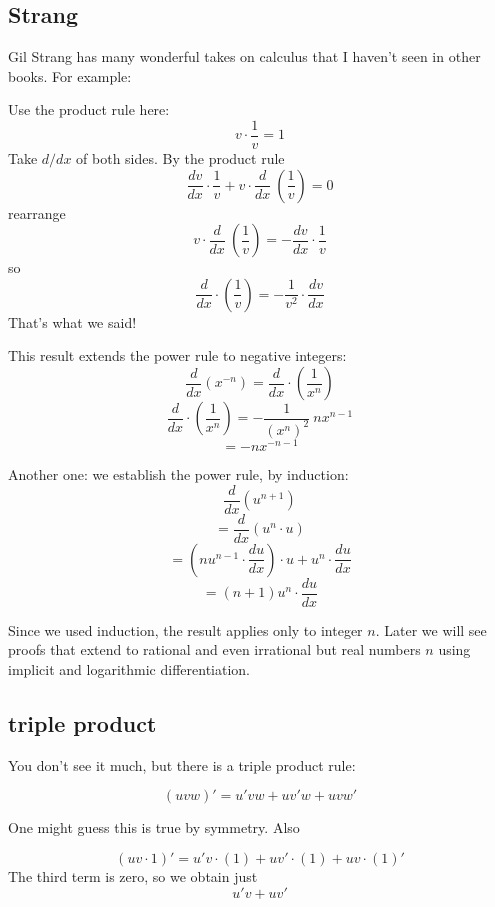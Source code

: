 \documentclass[11pt, oneside]{article}
\begin{document}
\subsection*{Strang}

Gil Strang has many wonderful takes on calculus that I haven't seen in other books.  For example:

Use the product rule here:
\[ v \cdot \frac{1}{v} = 1 \]
Take $d/dx$ of both sides.  By the product rule
\[ \frac{dv}{dx} \cdot \frac{1}{v} + v \cdot \frac{d}{dx} \ (\frac{1}{v}) = 0 \]
rearrange
\[ v \cdot \frac{d}{dx} \ (\frac{1}{v}) = - \frac{dv}{dx} \cdot \frac{1}{v}   \]
so
\[ \frac{d}{dx} \cdot (\frac{1}{v}) = -\frac{1}{v^2}  \cdot \frac{dv}{dx} \]
That's what we said!

This result extends the power rule to negative integers:
\[ \frac{d}{dx} (x^{-n}) = \frac{d}{dx} \cdot (\frac{1}{x^n}) \]
\[ \frac{d}{dx} \cdot (\frac{1}{x^n}) = - \frac{1}{(x^n)^2} \ nx^{n-1} \]
\[ = -n x^{-n-1} \]

Another one:  we establish the power rule, by induction:
\[ \frac{d}{dx} (u^{n+1}) \]
\[ = \frac{d}{dx} (u^n \cdot u) \]
\[ = (nu^{n-1} \cdot \frac{du}{dx}) \cdot u + u^n \cdot \frac{du}{dx} \]
\[ = (n+1) u^n \cdot \frac{du}{dx} \]

Since we used induction, the result applies only to integer $n$.  Later we will see proofs that extend to rational and even irrational but real numbers $n$ using implicit and logarithmic differentiation.

\subsection*{triple product}

You don't see it much, but there is a triple product rule:

\[ (uvw)' = u'vw + uv'w + uvw' \]

One might guess this is true by symmetry.  Also

\[ (uv \cdot 1)' = u'v \cdot (1) + uv' \cdot (1) + uv \cdot (1)' \]
The third term is zero, so we obtain just
\[ u'v + uv'  \]
\end{document}
